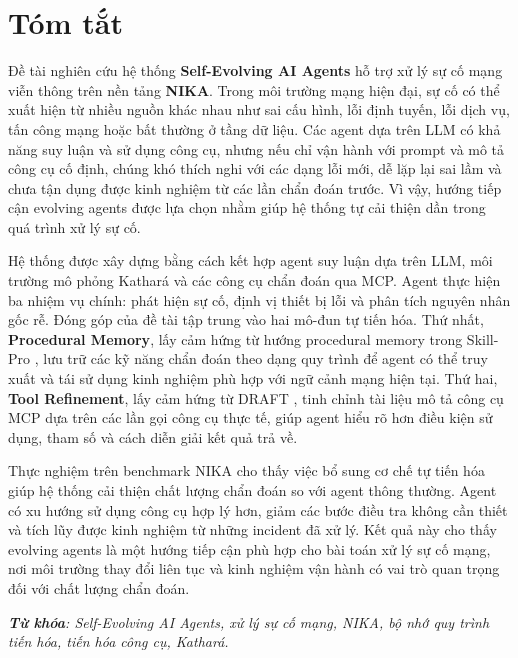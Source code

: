 \chapter*{Tóm tắt}

Đề tài nghiên cứu hệ thống \textbf{Self-Evolving AI Agents} hỗ trợ xử lý sự cố mạng viễn thông trên nền tảng \textbf{NIKA}. Trong môi trường mạng hiện đại, sự cố có thể xuất hiện từ nhiều nguồn khác nhau như sai cấu hình, lỗi định tuyến, lỗi dịch vụ, tấn công mạng hoặc bất thường ở tầng dữ liệu. Các agent dựa trên LLM có khả năng suy luận và sử dụng công cụ, nhưng nếu chỉ vận hành với prompt và mô tả công cụ cố định, chúng khó thích nghi với các dạng lỗi mới, dễ lặp lại sai lầm và chưa tận dụng được kinh nghiệm từ các lần chẩn đoán trước. Vì vậy, hướng tiếp cận evolving agents được lựa chọn nhằm giúp hệ thống tự cải thiện dần trong quá trình xử lý sự cố.

Hệ thống được xây dựng bằng cách kết hợp agent suy luận dựa trên LLM, môi trường mô phỏng Kathará và các công cụ chẩn đoán qua MCP. Agent thực hiện ba nhiệm vụ chính: phát hiện sự cố, định vị thiết bị lỗi và phân tích nguyên nhân gốc rễ. Đóng góp của đề tài tập trung vào hai mô-đun tự tiến hóa. Thứ nhất, \textbf{Procedural Memory}, lấy cảm hứng từ hướng procedural memory trong Skill-Pro \cite{skillpro2024}, lưu trữ các kỹ năng chẩn đoán theo dạng quy trình để agent có thể truy xuất và tái sử dụng kinh nghiệm phù hợp với ngữ cảnh mạng hiện tại. Thứ hai, \textbf{Tool Refinement}, lấy cảm hứng từ DRAFT \cite{draft2024}, tinh chỉnh tài liệu mô tả công cụ MCP dựa trên các lần gọi công cụ thực tế, giúp agent hiểu rõ hơn điều kiện sử dụng, tham số và cách diễn giải kết quả trả về.

Thực nghiệm trên benchmark NIKA cho thấy việc bổ sung cơ chế tự tiến hóa giúp hệ thống cải thiện chất lượng chẩn đoán so với agent thông thường. Agent có xu hướng sử dụng công cụ hợp lý hơn, giảm các bước điều tra không cần thiết và tích lũy được kinh nghiệm từ những incident đã xử lý. Kết quả này cho thấy evolving agents là một hướng tiếp cận phù hợp cho bài toán xử lý sự cố mạng, nơi môi trường thay đổi liên tục và kinh nghiệm vận hành có vai trò quan trọng đối với chất lượng chẩn đoán.

\vspace{10pt}
\noindent \textit{\textbf{Từ khóa}: Self-Evolving AI Agents, xử lý sự cố mạng, NIKA, bộ nhớ quy trình tiến hóa, tiến hóa công cụ, Kathará.}
